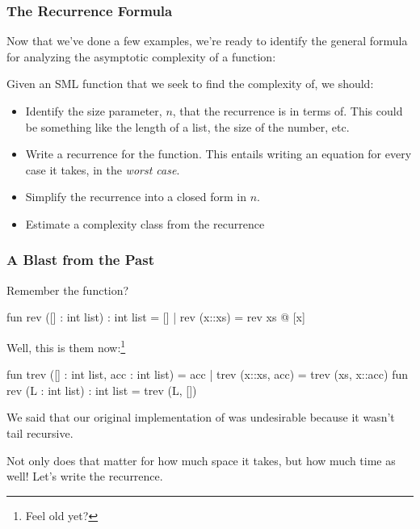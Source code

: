\documentclass[aspectratio=169, handout]{beamer}
\begin{document}
\begin{frame}[fragile]
  \frametitle{The Recurrence Formula}

  Now that we've done a few examples, we're ready to identify the general formula for
  analyzing the asymptotic complexity of a function:

  \pause
  \vspace{\fill}

  Given an SML function  that we seek to find the complexity of, we should:

  \pause
  \begin{itemize}
    \item Identify the size parameter, $n$, that the recurrence is in terms of. This could be something like
    the length of a list, the size of the number, etc. \pause
    \item Write a recurrence for the function. This entails writing an equation for every case it takes, in the
    \textit{worst case}. \pause
    \item Simplify the recurrence into a closed form in $n$. \pause
    \item Estimate a complexity class from the recurrence
  \end{itemize}
\end{frame}

\begin{frame}[fragile]
  \frametitle{A Blast from the Past}

  Remember the  function?

  \vspace{\fill}

  \begin{codeblock}
    fun rev ([] : int list) : int list = []
      | rev (x::xs) = rev xs @ [x]
  \end{codeblock}

  \pause
  Well, this is them now:\footnote{Feel old yet?}

  \pause
  \begin{codeblock}
    fun trev ([] : int list, acc : int list) = acc
      | trev (x::xs, acc) = trev (xs, x::acc)
    fun rev (L : int list) : int list = trev (L, [])
  \end{codeblock}

  \pause
  We said that our original implementation of  was undesirable because it wasn't tail recursive.

  \pause
  \vspace{\fill}

  Not only does that matter for how much space it takes, but how much time as well! Let's write the recurrence.

\end{frame}
\end{document}
